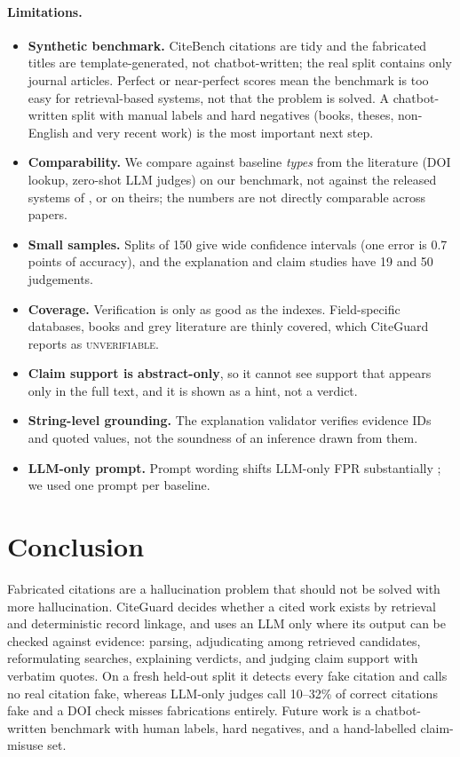 \documentclass[10pt,twocolumn,a4paper]{article}
\newcommand{\verdict}[1]{\textsc{\MakeLowercase{#1}}}
\newcommand{\cg}{CiteGuard}
\begin{document}
\paragraph{Limitations.}
\begin{itemize}
  \item \textbf{Synthetic benchmark.} CiteBench citations are tidy and the fabricated titles are
  template-generated, not chatbot-written; the real split contains only journal articles. Perfect or
  near-perfect scores mean the benchmark is too easy for retrieval-based systems, not that the
  problem is solved. A chatbot-written split with manual labels and hard negatives (books, theses,
  non-English and very recent work) is the most important next step.
  \item \textbf{Comparability.} We compare against baseline \emph{types} from the literature (DOI
  lookup, zero-shot LLM judges) on our benchmark, not against the released systems of
  \citet{khajavi2026citecheck}, \citet{li2026source} or \citet{kim2026hallmark} on theirs; the
  numbers are not directly comparable across papers.
  \item \textbf{Small samples.} Splits of 150 give wide confidence intervals (one error is 0.7
  points of accuracy), and the explanation and claim studies have 19 and 50 judgements.
  \item \textbf{Coverage.} Verification is only as good as the indexes. Field-specific databases,
  books and grey literature are thinly covered, which \cg{} reports as \verdict{UNVERIFIABLE}.
  \item \textbf{Claim support is abstract-only}, so it cannot see support that appears only in the
  full text, and it is shown as a hint, not a verdict.
  \item \textbf{String-level grounding.} The explanation validator verifies evidence IDs and quoted
  values, not the soundness of an inference drawn from them.
  \item \textbf{LLM-only prompt.} Prompt wording shifts LLM-only FPR substantially
  \citep{kim2026hallmark}; we used one prompt per baseline.
\end{itemize}

\section{Conclusion}
\label{sec:conclusion}

Fabricated citations are a hallucination problem that should not be solved with more hallucination.
\cg{} decides whether a cited work exists by retrieval and deterministic record linkage, and uses an
LLM only where its output can be checked against evidence: parsing, adjudicating among retrieved
candidates, reformulating searches, explaining verdicts, and judging claim support with verbatim
quotes. On a fresh held-out split it detects every fake citation and calls no real citation fake, whereas
LLM-only judges call 10--32\% of correct citations fake and a DOI check misses fabrications entirely. Future work is a
chatbot-written benchmark with human labels, hard negatives, and a hand-labelled claim-misuse set.
\end{document}
